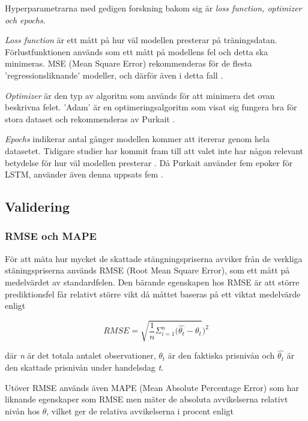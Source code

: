 \documentclass[11pt]{article}
\numberwithin{equation}{section}
\numberwithin{table}{section}
\numberwithin{figure}{section}
\begin{document}
Hyperparametrarna med gedigen forskning bakom sig är \emph{loss function, optimizer och epochs}. \par
\emph{Loss function} är ett mått på hur väl modellen presterar på träningsdatan. Förlustfunktionen används som ett mått på modellens fel och detta ska minimeras. MSE (Mean Square Error) rekommenderas för de flesta 'regressionsliknande' modeller, och därför även i detta fall \parencite[][,s.269-319]{purkait2019hands}. \par
\emph{Optimizer} är den typ av algoritm som används för att minimera det ovan beskrivna felet. 'Adam' är en optimeringsalgoritm som visat sig fungera bra för stora dataset och rekommenderas av Purkait \parencite*[][,s.269-319]{purkait2019hands}. \par
\emph{Epochs} indikerar antal gånger modellen kommer att itererar genom hela datasetet. Tidigare studier har kommit fram till att valet inte har någon relevant betydelse för hur väl modellen presterar \parencite{siaminamini2018forecasting}. Då Purkait använder fem epoker för LSTM, använder även denna uppsats fem \parencite[][,s.269-319]{purkait2019hands}. \par


\subsection{Validering}
\subsubsection{RMSE och MAPE}
För att mäta hur mycket de skattade stängningspriserna avviker från de verkliga stäningspriserna används RMSE (Root Mean Square Error), som ett mått på medelvärdet av standardfelen. Den bärande egenskapen hos RMSE är att större prediktionsfel får relativt större vikt då måttet baseras på ett viktat medelvärde enligt

\begin{equation}
RMSE = \sqrt{\frac{1}{n}\Sigma_{i=1}^{n}   (\hat{\theta_{t}} - \theta_{t}})^2
\end{equation}

där \emph{n} är det totala antalet observationer, $\theta_{t}$ är den faktiska prisnivån och $\hat{\theta_{t}}$ är den skattade prisnivån under handelsdag \emph{t}. 

Utöver RMSE används även MAPE (Mean Absolute Percentage Error) som har liknande egenskaper som RMSE men mäter de absoluta avvikelserna relativt nivån hos $\theta$, vilket ger de relativa avvikelserna i procent enligt
\end{document}
